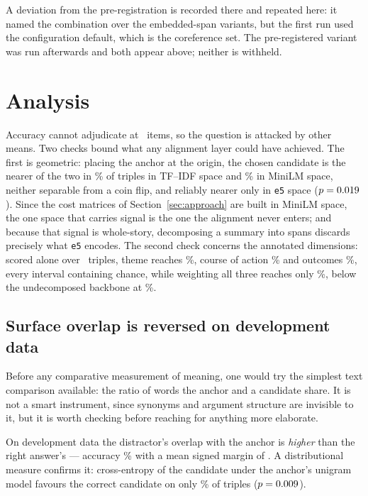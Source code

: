\documentclass[11pt,letterpaper,twocolumn]{article}
\begin{document}
A deviation from the pre-registration is recorded there and repeated here: it
named the combination over the embedded-span variants, but the first run used
the configuration default, which is the coreference set. The pre-registered
variant was run afterwards and both appear above; neither is withheld.


\section{Analysis}\label{sec:analysis}
Accuracy cannot adjudicate at \DevN\ items, so the question is attacked by
other means. Two checks bound what any alignment layer could have achieved. The
first is geometric: placing the anchor at the origin, the chosen candidate is
the nearer of the two in \GeomTfidfCloserPct\% of triples in TF--IDF space and
\GeomMiniLMCloserPct\% in MiniLM space, neither separable from a coin flip, and
reliably nearer only in \texttt{e5} space ($p=0.019$). Since the
cost matrices of Section~\ref{sec:approach} are built in MiniLM space, the one
space that carries signal is the one the alignment never enters; and because
that signal is whole-story, decomposing a summary into spans discards precisely
what \texttt{e5} encodes. The second check concerns the annotated dimensions:
scored alone over \CompN\ triples, theme reaches \CompThemeAcc\%, course of
action \CompActionAcc\% and outcomes \CompOutcomeAcc\%, every interval
containing chance, while weighting all three reaches only \LSevenAcc\%, below
the undecomposed backbone at \LTwoAcc\%.

\subsection{Surface overlap is reversed on development data}
Before any comparative measurement of meaning, one would try the simplest text
comparison available: the ratio of words the anchor and a candidate share. It
is not a smart instrument, since synonyms and argument structure are invisible
to it, but it is worth checking before reaching for anything more elaborate.

On development data the distractor's overlap with the anchor is \emph{higher}
than the right answer's --- accuracy \JaccardAcc\% with a mean signed margin of
\JaccardMargin. A distributional measure confirms it: cross-entropy of the
candidate under the anchor's unigram model favours the correct candidate on only
\LexContentCrossEntPct\% of triples ($p = 0.009$).
\end{document}
